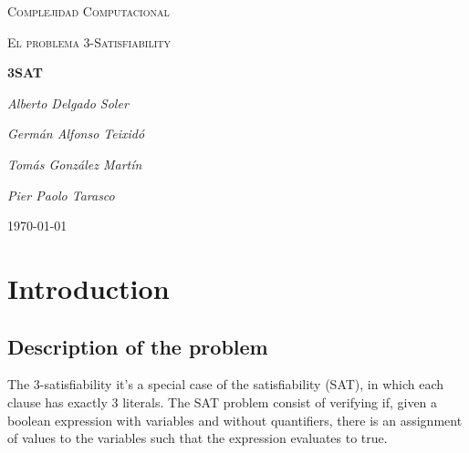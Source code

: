 \documentclass{article}
\begin{document}
\begin{titlepage}
	\centering
	{\scshape\LARGE Complejidad Computacional\par}
	\vspace{1cm}
	{\scshape\Large El problema 3-Satisfiability\par}
	\vspace{1.5cm}
	{\huge\bfseries 3SAT\par}
	\vspace{2cm}
	{\Large\itshape Alberto Delgado Soler\par}
	{\Large\itshape Germán Alfonso Teixidó\par}
	{\Large\itshape Tomás González Martín\par}
	{\Large\itshape Pier Paolo Tarasco\par}
	  
	 \vfill

	{\large \today\par}
\end{titlepage}


\section{Introduction}
\subsection{Description of the problem}
The 3-satisfiability it's a special case of the satisfiability (SAT), in which each clause has exactly 3 literals. The SAT problem consist of verifying if, given a boolean expression with variables and without quantifiers, there is an assignment of values to the variables such that the expression evaluates to true.
\end{document}
